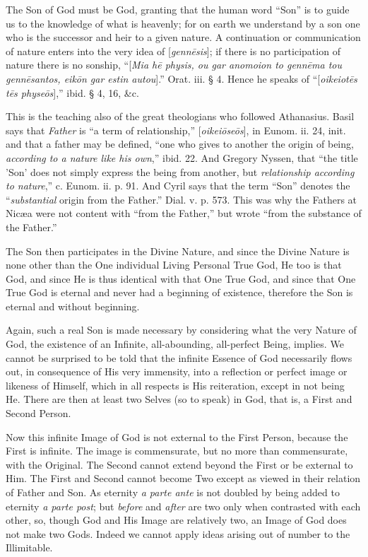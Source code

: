 The Son of God must be God, granting that the
human word ``Son'' is to guide us to the knowledge of what is heavenly;
for on earth we understand by a son one who is the successor and heir
to a given nature. A continuation or communication of nature enters
into the very idea of [\emph{genn\={e}sis}]; if there is no
participation of nature there is no sonship, ``[\emph{Mia h\={e}
physis, ou gar anomoion to genn\={e}ma tou genn\={e}santos, eik\={o}n
gar estin autou}].'' Orat. iii. § 4. Hence he speaks of ``[\emph{oikeiot\={e}s
t\={e}s physe\={o}s}],'' ibid. § 4, 16, \&c.

This is the teaching also of the great
theologians who followed Athanasius. Basil says that \emph{Father} is ``a
term of relationship,'' [\emph{oikei\={o}se\={o}s}], in Eunom.
ii. 24, init. and that a father may be defined, ``one who gives to
another the origin of being, \emph{according to a nature like his own},''
ibid. 22. And Gregory Nyssen, that ``the title 'Son' does not simply
express the being from another, but \emph{relationship according to
nature},'' c. Eunom. ii. p. 91. And Cyril says that the term ``Son''
denotes the ``\emph{substantial} origin from the Father.'' Dial.
v. p. 573. This was why the Fathers at Nicæa were not content with ``from
the Father,'' but wrote ``from the substance of the Father.''

The Son then participates in the Divine Nature,
and since the Divine Nature is none other than the One individual
Living Personal True God, He too is that God, and since He is thus
identical with that One True God, and since that One True God is
eternal and never had a beginning of existence, therefore the Son is
eternal and without beginning.

Again, such a real Son is made necessary by
considering what the very Nature of God, the existence of an Infinite,
all-abounding, all-perfect Being, implies. We cannot be surprised to
be told that the infinite Essence of God necessarily flows out, in
consequence of His very immensity, into a reflection or perfect image
or likeness of Himself, which in all respects is His reiteration,
except in not being He. There are then at least two Selves (so to
speak) in God, that is, a First and Second Person.

Now this infinite Image of God is not external to
the First Person, because the First is infinite. The image is
commensurate, but no more than commensurate, with the Original. The
Second cannot extend beyond the First or be external to Him. The First
and Second cannot become Two except as viewed in their relation of
Father and Son. As eternity \emph{a parte ante} is not doubled by
being added to eternity \emph{a parte post}; but \emph{before} and \emph{after}
are two only when contrasted with each other, so, though God and His
Image are relatively two, an Image of God does not make two
Gods. Indeed we cannot apply ideas arising out of number to the
Illimitable.


